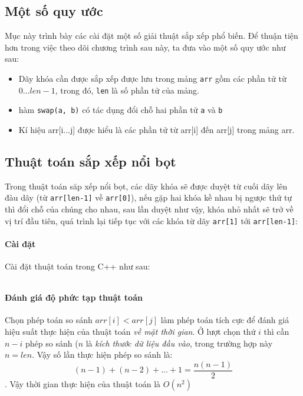 \documentclass[a4paper,12pt]{report}
\newcommand{\mnt}[1]{\inputminted[frame=single, linenos=true, tabsize=4]{c++}{#1}}
\begin{document}
\subsection{Một số quy ước}
Mục này trình bày các cài đặt một số giải thuật sắp xếp phổ biến. Để thuận tiện hơn trong việc theo dõi chương trình sau này, ta đưa vào một số quy ước như sau:\\
\begin{itemize}
\item Dãy khóa cần được sắp xếp được lưu trong mảng \texttt{arr} gồm các phần tử từ $0...len-1$, trong đó, \texttt{len} là số phần tử của mảng.
\item hàm \texttt{swap(a, b)} có tác dụng đổi chỗ hai phần tử \texttt{a} và \texttt{b}
\item Kí hiệu arr[i...j] được hiểu là các phần tử từ arr[i] đến arr[j] trong mảng arr.
\end{itemize}



\subsection{Thuật toán sắp xếp nổi bọt}

Trong thuật toán săp xếp nổi bọt, các dãy khóa sẽ được duyệt từ cuối dãy lên đàu dãy (từ \texttt{arr[len-1]} về \texttt{arr[0]}), nếu gặp hai khóa kề nhau bị ngược thứ tự thì đổi chỗ của chúng cho nhau, sau lần duyệt như vậy, khóa nhỏ nhất sẽ trở về vị trí đầu tiên, quá trình lại tiếp tục với các khóa từ dãy \texttt{arr[1]} tới \texttt{arr[len-1]}:

\paragraph{Cài đặt}
Cài đặt thuật toán trong C++ như sau:
\mnt{src/bublesort.cpp}

\paragraph{Đánh giá độ phức tạp thuật toán}
Chọn phép toán so sánh $arr[i] < arr[j]$ làm phép toán tích cực để đánh giá hiệu suất thực hiện của thuật toán \emph{về mặt thời gian}. Ở lượt chọn thứ $i$ thì cần $n-i$ phép so sánh ($n$ là \emph{kích thước dữ liệu đầu vào}, trong trường hợp này $n = len$. Vậy số lần thực hiện phép so sánh là:
$$(n-1) + (n-2) + ... + 1 = \frac{n(n-1)}{2}$$. Vậy thời gian thực hiện của thuật toán là $O(n^2)$
\end{document}
